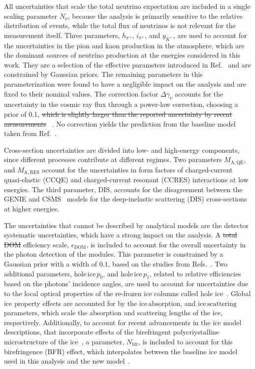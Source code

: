 \documentclass[
    aps,
    prd,
    reprint,
    amsmath,
    amssymb,
    nofootinbib,
    superscriptaddress,
    floatfix
]{revtex4-2}
\renewcommand{\rm}{\mathrm}
\newcommand{\rm}{\mathrm}
\providecommand{\DIFaddtex}[1]{{\protect\color{blue}\uwave{#1}}} %
\providecommand{\DIFdeltex}[1]{{\protect\color{red}\sout{#1}}}                      %
\providecommand{\DIFaddbegin}{} %
\providecommand{\DIFaddend}{} %
\providecommand{\DIFdelbegin}{} %
\providecommand{\DIFdelend}{} %
\providecommand{\DIFadd}[1]{\texorpdfstring{\DIFaddtex{#1}}{#1}} %
\providecommand{\DIFdel}[1]{\texorpdfstring{\DIFdeltex{#1}}{}} %
\newcommand{\DIFscaledelfig}{0.5}
\newlength{\DIFdelgraphicswidth} %
\newlength{\DIFdelgraphicsheight} %
\newcommand{\DIFaddincludegraphics}[2][]{{\color{blue}\fbox{\DIFOincludegraphics[#1]{#2}}}} %
\newcommand{\DIFdelincludegraphics}[2][]{%
\sbox{\DIFdelgraphicsbox}{\DIFOincludegraphics[#1]{#2}}%
\settoboxwidth{\DIFdelgraphicswidth}{\DIFdelgraphicsbox} %
\settoboxtotalheight{\DIFdelgraphicsheight}{\DIFdelgraphicsbox} %
\scalebox{\DIFscaledelfig}{%
\parbox[b]{\DIFdelgraphicswidth}{\usebox{\DIFdelgraphicsbox}\\[-\baselineskip] \rule{\DIFdelgraphicswidth}{0em}}\llap{\resizebox{\DIFdelgraphicswidth}{\DIFdelgraphicsheight}{%
\setlength{\unitlength}{\DIFdelgraphicswidth}%
\begin{picture}(1,1)%
\thicklines\linethickness{2pt} %
{\color[rgb]{1,0,0}\put(0,0){\framebox(1,1){}}}%
{\color[rgb]{1,0,0}\put(0,0){\line( 1,1){1}}}%
{\color[rgb]{1,0,0}\put(0,1){\line(1,-1){1}}}%
\end{picture}%
}\hspace*{3pt}}} %
} %
\DeclareRobustCommand{\DIFaddbegin}{\DIFOaddbegin \let\includegraphics\DIFaddincludegraphics} %
\DeclareRobustCommand{\DIFaddend}{\DIFOaddend \let\includegraphics\DIFOincludegraphics} %
\DeclareRobustCommand{\DIFdelbegin}{\DIFOdelbegin \let\includegraphics\DIFdelincludegraphics} %
\DeclareRobustCommand{\DIFdelend}{\DIFOaddend \let\includegraphics\DIFOincludegraphics} %
\begin{document}
All uncertainties that scale the total neutrino expectation are included in a single scaling parameter $N_{\nu}$, because the analysis is primarily sensitive to the relative distribution of events, while the total flux of neutrinos is not relevant for the measurement itself.
Three parameters, $h_{\pi^+}$, $i_{\pi^+}$, and $y_{K^+}$, are used to account for the uncertainties in the pion and kaon production in the atmosphere, which are the dominant sources of neutrino production at the energies considered in this work.
They are a selection of the effective parameters introduced in Ref.~\cite{Barr:2006it} and are constrained by Gaussian priors.
The remaining parameters in this parameterization were found to have a negligible impact on the analysis and are fixed to their nominal values.
The correction factor $\Delta \gamma_\nu$ accounts for the uncertainty in the cosmic ray flux through a power-law correction, choosing a prior of 0.1, \DIFdelbegin \DIFdel{which is slightly larger than the reported uncertainty by recent measurements }\DIFdelend \DIFaddbegin \DIFadd{based on recent measurements from Ref.}\DIFaddend ~\cite{PhysRevD.95.023012}.
No correction yields the prediction from the baseline model taken from Ref.~\cite{PhysRevD.92.023004_Honda_Flux}.

Cross-section uncertainties are divided into low- and high-energy components, since different processes contribute at different regimes.
Two parameters $M_\rm{A,QE}$, and $M_\rm{A,RES}$ account for the uncertainties in form factors of charged-current quasi-elastic (CCQE) and charged-current resonant (CCRES) interactions at low energies.
The third parameter, $\rm{DIS}$, accounts for the disagreement between the \textsc{GENIE} and CSMS~\cite{csms} models for the deep-inelastic scattering (DIS) cross-sections at higher energies.

The uncertainties that cannot be described by analytical models are the detector systematic uncertainties, which have a strong impact on the analysis.
A \DIFdelbegin \DIFdel{total DOM }\DIFdelend \DIFaddbegin \DIFadd{DOM light detection }\DIFaddend efficiency scale, $\epsilon_{\rm{DOM}}$, is included to account for the overall uncertainty in the photon detection of the modules.
This parameter is constrained by a Gaussian prior with a width of $0.1$, based on the studies from Refs.~\cite{JFeintzeig_phd, domeff_nick}.
Two additional parameters, $\rm{hole \, ice} \, p_0$, and $\rm{hole \, ice} \, p_1$, related to relative efficiencies based on the photons' incidence angles, are used to account for uncertainties due to the local optical properties of the re-frozen ice columns called hole ice~\cite{Eller:2023ko}.
Global ice property effects are accounted for by the $\rm{ice \, absorption}$, and $\rm{ice \, scattering}$ parameters, which scale the absorption and scattering lengths of the ice, respectively.
Additionally, to account for recent advancements in the ice model descriptions, that incorporate effects of the birefringent polycriystalline microstructure of the ice~\cite{bfr_ice_tc-18-75-2024}, a parameter, $N_\rm{bfr}$, is included to account for this birefringence (BFR) effect, which interpolates between the baseline ice model used in this analysis and the new model~\cite{IceCube:2024xjj}.
\end{document}
